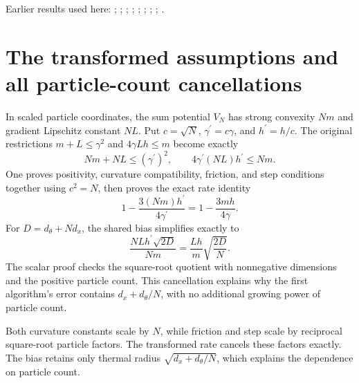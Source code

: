 \documentclass[11pt,a4paper]{article}
\begin{document}
Earlier results used here: \cite[Section~3.33.6]{LangevinLean2026ULASC}; \cite[Section~3.8.17]{LangevinLean2026ULASC}; \cite[Section~3.1.1]{LangevinLean2026IPLA}; \cite[Section~3.1.4]{LangevinLean2026IPLA}; \cite[Section~3.114.3]{LangevinLean2026Kinetic}; \cite[Section~3.12.2]{LangevinLean2026Kinetic}; \cite[Section~3.36.1]{LangevinLean2026Kinetic}; \cite[Section~3.36.2]{LangevinLean2026Kinetic}; \cite[Section~3.57.14]{LangevinLean2026Kinetic}.

\section{\texorpdfstring{The transformed assumptions and all particle-count cancellations}{The transformed assumptions and all particle-count cancellations}}


In scaled particle coordinates, the sum potential \(V_N\) has strong convexity \(Nm\) and gradient Lipschitz constant \(NL\). Put \(c=\sqrt N\), \(\gamma^\prime=c\gamma\), and \(h^\prime=h/c\). The original restrictions \(m+L\le\gamma^2\) and \(4\gamma Lh\le m\) become exactly \[Nm+NL\le(\gamma^\prime)^2,\qquad4\gamma^\prime(NL)h^\prime\le Nm.\] One proves positivity, curvature compatibility, friction, and step conditions together using \(c^2=N\), then proves the exact rate identity \[1-\frac{3(Nm)h^\prime}{4\gamma^\prime}=1-\frac{3mh}{4\gamma}.\] For \(D=d_\theta+Nd_x\), the shared bias simplifies exactly to \[\frac{NLh^\prime\sqrt{2D}}{Nm}=\frac{Lh}{m}\sqrt{\frac{2D}{N}}.\] The scalar proof checks the square-root quotient with nonnegative dimensions and the positive particle count. This cancellation explains why the first algorithm’s error contains \(d_x+d_\theta/N\), with no additional growing power of particle count.



Both curvature constants scale by \(N\), while friction and step scale by reciprocal square-root particle factors. The transformed rate cancels these factors exactly. The bias retains only thermal radius \(\sqrt{d_x+d_\theta/N}\), which explains the dependence on particle count.
\end{document}
